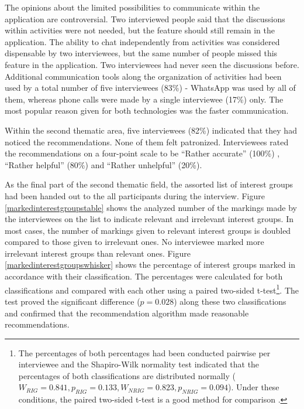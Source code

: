 \documentclass[12pt,numbers=noenddot,parskip,bibliography=totocnumbered,listof=totocnumbered,draft]{scrreprt}
\begin{document}
The opinions about the limited possibilities to communicate within the application are controversial. Two interviewed people said that the discussions within activities were not needed, but the feature should still remain in the application. The ability to chat independently from activities was considered dispensable by two interviewees, but the same number of people missed this feature in the application. Two interviewees had never seen the discussions before. Additional communication tools along the organization of activities had been used by a total number of five interviewees (83\%) - \mbox{WhatsApp} \citep{whatsapp} was used by all of them, whereas phone calls were made by a single interviewee (17\%) only. The most popular reason given for both technologies was the faster communication.

Within the second thematic area, five interviewees (82\%) indicated that they had noticed the recommendations. None of them felt patronized. Interviewees rated the recommendations on a four-point scale to be ``Rather accurate'' (100\%) , ``Rather helpful'' (80\%) and ``Rather unhelpful'' (20\%).

As the final part of the second thematic field, the assorted list of interest groups had been handed out to the all participants during the interview. Figure \ref{markedinterestgroupstable} shows the analyzed number of the markings made by the interviewees on the list to indicate relevant and irrelevant interest groups. In most cases, the number of markings given to relevant interest groups is doubled compared to those given to irrelevant ones. No interviewee marked more irrelevant interest groups than relevant ones. Figure \ref{markedinterestgroupswhisker} shows the percentage of interest groups marked in accordance with their classification. The percentages were calculated for both classifications and compared with each other using a paired two-sided t-test\footnote{The percentages of both percentages had been conducted pairwise per interviewee and the Shapiro-Wilk \citep[p.466]{hedderich2015} normality test indicated that the percentages of both classifications are distributed normally ($W_{RIG}=0.841, p_{RIG}=0.133, W_{NRIG}=0.823, p_{NRIG}=0.094$). Under these conditions, the paired two-sided t-test is a good method for comparison \citep[p.523]{hedderich2015}.}. The test proved the significant difference ($p=0.028$) along these two classifications and confirmed that the recommendation algorithm made reasonable recommendations.
\end{document}

